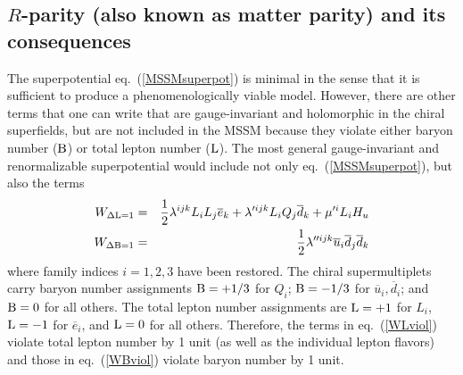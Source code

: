 \documentclass[12pt]{article}
\def\beq{\begin{eqnarray}}
\def\eeq{\end{eqnarray}}
\def\Baryon{{\rm B}}
\def\Lepton{{\rm L}}
\def\sbar{\overline}
\begin{document}
\subsection{$R$-parity (also known as matter parity) and its
consequences}\label{subsec:mssm.rparity}
\setcounter{equation}{0}

The superpotential eq.~(\ref{MSSMsuperpot}) is minimal in the sense that
it is sufficient to produce a phenomenologically viable model. However,
there are other terms that one can write that are gauge-invariant
and holomorphic in the chiral superfields, but are not included in the MSSM
because they violate either baryon number ($\Baryon$) or total lepton
number ($\Lepton$). The most general gauge-invariant and renormalizable
superpotential would include not only eq.~(\ref{MSSMsuperpot}), but also
the terms
\beq
W_{\Delta {\rm L} =1} &=&
{1\over 2} \lambda^{ijk} L_iL_j{\sbar e_k}
+ \lambda^{\prime ijk} L_i Q_j {\sbar d_k}
+ \mu^{\prime i} L_i H_u
\label{WLviol} \\
W_{\Delta {\rm B}= 1} &=& {1\over 2} \lambda^{\prime\prime ijk}
{\sbar u_i}{\sbar d_j}{\sbar d_k}
\label{WBviol}
\eeq
where family indices $i=1,2,3$ have been restored. The chiral
supermultiplets carry baryon number assignments $\Baryon=+1/3$ for $Q_i$;
$\Baryon=-1/3$ for $\sbar u_i, \sbar d_i$; and $\Baryon=0$ for all others.
The total lepton number assignments are $\Lepton=+1$ for $L_i$,
$\Lepton=-1$ for $\sbar e_i$, and $\Lepton=0$ for all others. Therefore,
the terms in eq.~(\ref{WLviol}) violate total lepton number by 1 unit (as
well as the individual lepton flavors) and those in eq.~(\ref{WBviol})
violate baryon number by 1 unit. 
\end{document}
